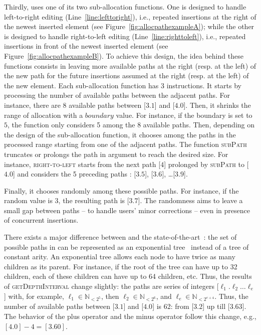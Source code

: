 \noindent Thirdly, \LSEQ uses one of its two sub-allocation functions. One is
designed to handle left-to-right editing (Line~\ref{line:lefttoright}), i.e.,
repeated insertions at the right of the newest inserted element (see
Figure~\ref{fig:allocpathexampleA}); while the other is designed to handle
right-to-left editing (Line~\ref{line:righttoleft}), i.e., repeated insertions
in front of the newest inserted element (see
Figure~\ref{fig:allocpathexampleB}). To achieve this design, the idea behind
these functions consists in leaving more available paths at the right (resp. at
the left) of the new path for the future insertions assumed at the right
(resp. at the left) of the new element. Each sub-allocation function has 3
instructions. It starts by processing the number of available paths between the
adjacent paths. For instance, there are 8 available paths between [$3.1$] and
[$4.0$]. Then, it shrinks the range of allocation with a $boundary$ value. For
instance, if the boundary is set to $5$, the function only considers 5 among the
8 available paths. Then, depending on the design of the sub-allocation function,
it chooses among the paths in the processed range starting from one of the
adjacent paths. The function \textsc{subPath} truncates or prolongs the path in
argument to reach the desired size. For instance, \textsc{right-to-left} starts
from the next path [$4$] prolonged by \textsc{subPath} to [$4.0$] and considers
the 5 preceding paths : [$3.5$], [$3.6$], \ldots [$3.9$].

\noindent Finally, it chooses randomly among these possible paths. For instance,
if the random value is 3, the resulting path is [$3.7$]. The randomness aims to
leave a small gap between paths -- to handle users' minor corrections -- even in
presence of concurrent insertions.

There exists a major difference between \LSEQ and the
state-of-the-art~\cite{preguica2009commutative, weiss2009logoot}: the set of
possible paths in \LSEQ can be represented as an exponential
tree~\cite{andersson1996faster,andersson2007dynamic} instead of a tree of
constant arity. An exponential tree allows each node to have twice as many
children as its parent. For instance, if the root of the tree can have up to 32
children, each of these children can have up to 64 children, etc. Thus, the
results of \textsc{getDepthInterval} change slightly: the paths are series of
integers [$\ell_1.\ell_2\ldots\ell_e$] with, for example,
$\ell_1\in\mathbb{N}_{<2^5}$, then $\ell_2\in \mathbb{N}_{<2^6}$, and
$\ell_{e}\in\mathbb{N}_{<2^{e+4}}$. Thus, the number of available paths between
[$3.1$] and [$4.0$] is 62: from [$3.2$] up till [$3.63$]. The behavior of the
plus operator and the minus operator follow this change, e.g.,
$[4.0] - 4 = [3.60]$.

